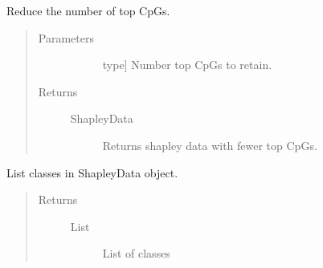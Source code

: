 \documentclass[letterpaper,10pt,english]{sphinxmanual}
\begin{document}
\begin{fulllineitems}

\begin{fulllineitems}
\label{\detokenize{index:methylnet.interpretation_classes.ShapleyDataExplorer.limit_number_top_cpgs}}
Reduce the number of top CpGs.
\begin{quote}\begin{description}
\item[{Parameters}] \leavevmode\begin{description}
\item[{}] \leavevmode{[}type{]}
Number top CpGs to retain.

\end{description}

\item[{Returns}] \leavevmode\begin{description}
\item[{ShapleyData}] \leavevmode
Returns shapley data with fewer top CpGs.

\end{description}

\end{description}\end{quote}

\end{fulllineitems}


\begin{fulllineitems}
\label{\detokenize{index:methylnet.interpretation_classes.ShapleyDataExplorer.list_classes}}
List classes in ShapleyData object.
\begin{quote}\begin{description}
\item[{Returns}] \leavevmode\begin{description}
\item[{List}] \leavevmode
List of classes

\end{description}


\end{description}
\end{quote}
\end{fulllineitems}
\end{fulllineitems}
\end{document}
